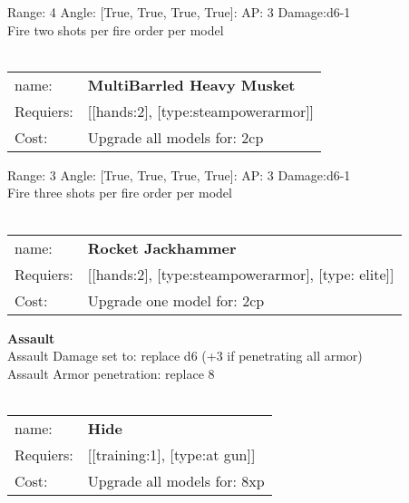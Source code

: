 Range: 4  Angle: [True, True, True, True]: AP: 3 Damage:d6-1 \\
Fire two shots per fire order per model\\ 








\ \\
\begin{tabular}{ll}
name: & {\bf MultiBarrled Heavy Musket } \\
Requiers: & [[hands:2], [type:steampowerarmor]] \\
Cost: & Upgrade all models for: 2cp \\
\end{tabular}



Range: 3  Angle: [True, True, True, True]: AP: 3 Damage:d6-1 \\
Fire three shots per fire order per model\\ 








\ \\
\begin{tabular}{ll}
name: & {\bf Rocket Jackhammer } \\
Requiers: & [[hands:2], [type:steampowerarmor], [type: elite]] \\
Cost: & Upgrade one model for: 2cp \\
\end{tabular}





{\bf Assault} \ \\
Assault Damage set to: replace d6 (+3 if penetrating all armor)
\\ 
Assault Armor penetration: replace 8 
\\ 




\ \\
\begin{tabular}{ll}
name: & {\bf Hide } \\
Requiers: & [[training:1], [type:at gun]] \\
Cost: & Upgrade all models for: 8xp \\
\end{tabular}

